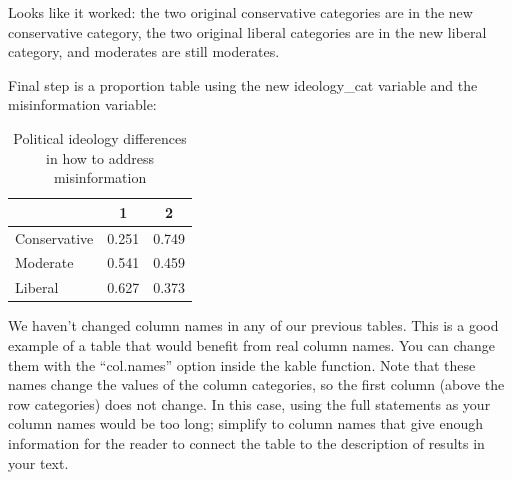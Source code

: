 \documentclass[
  letterpaper,
  DIV=11,
  numbers=noendperiod]{scrartcl}
\newenvironment{Shaded}{\begin{snugshade}}{\end{snugshade}}
\newcommand{\AttributeTok}[1]{\textcolor[rgb]{0.40,0.45,0.13}{#1}}
\newcommand{\ConstantTok}[1]{\textcolor[rgb]{0.56,0.35,0.01}{#1}}
\newcommand{\DecValTok}[1]{\textcolor[rgb]{0.68,0.00,0.00}{#1}}
\newcommand{\FunctionTok}[1]{\textcolor[rgb]{0.28,0.35,0.67}{#1}}
\newcommand{\NormalTok}[1]{\textcolor[rgb]{0.00,0.23,0.31}{#1}}
\newcommand{\SpecialCharTok}[1]{\textcolor[rgb]{0.37,0.37,0.37}{#1}}
\newcommand{\StringTok}[1]{\textcolor[rgb]{0.13,0.47,0.30}{#1}}
\begin{document}
Looks like it worked: the two original conservative categories are in
the new conservative category, the two original liberal categories are
in the new liberal category, and moderates are still moderates.

Final step is a proportion table using the new ideology\_cat variable
and the misinformation variable:

\begin{Shaded}
\end{Shaded}

\begin{table}[!h]

\caption{Political ideology differences in how to address misinformation}
\centering
\begin{tabular}[t]{lcc}
\toprule
  & 1 & 2\\
\midrule
Conservative & 0.251 & 0.749\\
Moderate & 0.541 & 0.459\\
Liberal & 0.627 & 0.373\\
\bottomrule
\end{tabular}
\end{table}

We haven't changed column names in any of our previous tables. This is a
good example of a table that would benefit from real column names. You
can change them with the ``col.names'' option inside the kable function.
Note that these names change the values of the column categories, so the
first column (above the row categories) does not change. In this case,
using the full statements as your column names would be too long;
simplify to column names that give enough information for the reader to
connect the table to the description of results in your text.
\end{document}

